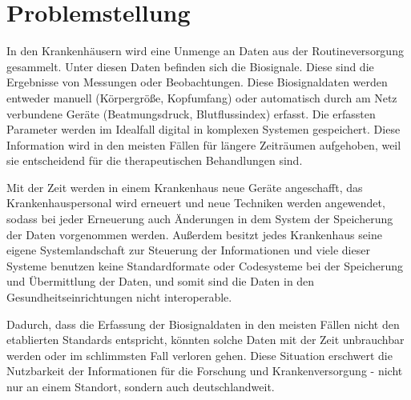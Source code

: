 \section{Problemstellung} \label{sec:problem}

In den Krankenhäusern wird eine Unmenge an Daten aus der Routineversorgung gesammelt. Unter diesen Daten befinden sich die Biosignale. Diese sind die Ergebnisse von Messungen oder Beobachtungen. Diese Biosignaldaten werden entweder manuell (Körpergröße, Kopfumfang) oder automatisch durch am Netz verbundene Geräte (Beatmungsdruck, Blutflussindex) erfasst. Die erfassten Parameter werden im Idealfall digital in komplexen Systemen gespeichert. Diese Information wird in den meisten Fällen für längere Zeiträumen aufgehoben, weil sie entscheidend für die therapeutischen Behandlungen sind. 

Mit der Zeit werden in einem Krankenhaus neue Geräte angeschafft, das Krankenhauspersonal wird erneuert und neue Techniken werden angewendet, sodass bei jeder Erneuerung auch Änderungen in dem System der Speicherung der Daten vorgenommen werden. Außerdem besitzt jedes Krankenhaus seine eigene Systemlandschaft zur Steuerung der Informationen und viele dieser Systeme benutzen keine Standardformate oder Codesysteme bei der Speicherung und Übermittlung der Daten, und somit sind die Daten in den Gesundheitseinrichtungen nicht interoperable. 

Dadurch, dass die Erfassung der Biosignaldaten in den meisten Fällen nicht den etablierten Standards entspricht, könnten solche Daten mit der Zeit unbrauchbar werden oder im schlimmsten Fall verloren gehen. Diese Situation erschwert die Nutzbarkeit der Informationen für die Forschung und Krankenversorgung - nicht nur an einem Standort, sondern auch deutschlandweit.